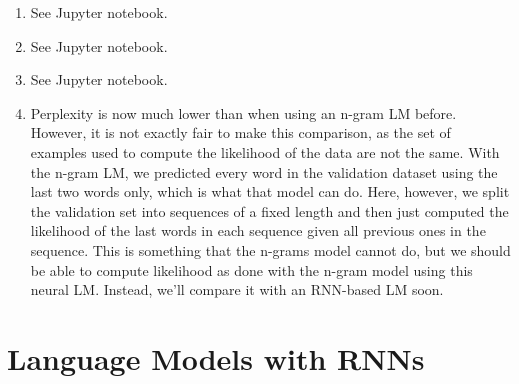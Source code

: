 \documentclass[11pt,a4paper]{article}
\begin{document}
\begin{enumerate}[label=(\alph*)]
    \item See Jupyter notebook.
    \item See Jupyter notebook.
    \item See Jupyter notebook.
    \item Perplexity is now much lower than when using an n-gram LM before.
          However, it is not exactly fair to make this comparison, as the set of
          examples used to compute the likelihood of the data are not the same.
          With the n-gram LM, we predicted every word in the validation dataset
          using the last two words only, which is what that model can do.
          Here, however, we split the validation set into sequences of a fixed
          length and then just computed the likelihood of the last words in each
          sequence given all previous ones in the sequence.
          This is something that the n-grams model cannot do, but we should be
          able to compute likelihood as done with the n-gram model using this
          neural LM.
          Instead, we'll compare it with an RNN-based LM soon.
\end{enumerate}

\section{Language Models with RNNs}
\end{document}
